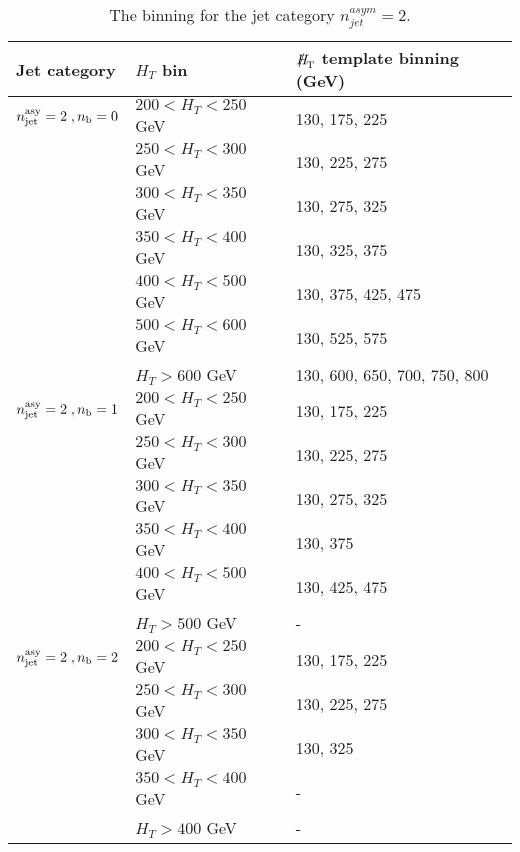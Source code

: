 \begin{table}[h!]
  \scriptsize
  \centering
  \caption{The \MHT binning for the jet category $n_{jet}^{asym} = 2$. 
  \label{tab:mhtBins_eq2a}}
  \begin{tabular}{ lll }
    Jet category & $H_{T}$ bin & $\MHT$ template binning (GeV) \\ \hline

    \hline
    $n_{\text{jet}}^{\mathrm{asy}}  =   2 \;, n_{\text{b}} = 0 $ & $200 < H_{T} < 250$ GeV & 130, 175, 225 \\ 
     & $250 < H_{T} < 300$ GeV & 130, 225, 275 \\ 
     & $300 < H_{T} < 350$ GeV & 130, 275, 325 \\ 
     & $350 < H_{T} < 400$ GeV & 130, 325, 375 \\ 
     & $400 < H_{T} < 500$ GeV & 130, 375, 425, 475 \\ 
     & $500 < H_{T} < 600$ GeV & 130, 525, 575 \\ 
     & $H_{T} > 600$ GeV & 130, 600, 650, 700, 750, 800 \\ 
    \hline
    $n_{\text{jet}}^{\mathrm{asy}}  =   2 \;, n_{\text{b}} = 1$ & $200 < H_{T} < 250$ GeV & 130, 175, 225 \\ 
     & $250 < H_{T} < 300$ GeV & 130, 225, 275 \\ 
     & $300 < H_{T} < 350$ GeV & 130, 275, 325 \\ 
     & $350 < H_{T} < 400$ GeV & 130, 375 \\ 
     & $400 < H_{T} < 500$ GeV & 130, 425, 475 \\ 
     & $H_{T} > 500$ GeV & - \\ 
    \hline
    $n_{\text{jet}}^{\mathrm{asy}}  =   2 \;, n_{\text{b}} = 2$ & $200 < H_{T} < 250$ GeV & 130, 175, 225 \\ 
     & $250 < H_{T} < 300$ GeV & 130, 225, 275 \\ 
     & $300 < H_{T} < 350$ GeV & 130, 325 \\ 
     & $350 < H_{T} < 400$ GeV & - \\ 
     & $H_{T} > 400$ GeV & - \\ 

  \end{tabular}
\end{table}



